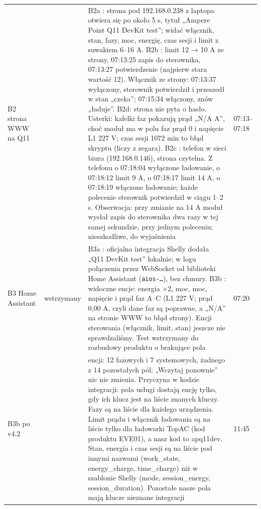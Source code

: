 \documentclass[11pt,a4paper]{article}
\begin{document}
\begin{longtable}{>{\raggedright\arraybackslash}p{3.00cm}>{\raggedright\arraybackslash}p{2.62cm}>{\raggedright\arraybackslash}p{7.10cm}>{\raggedright\arraybackslash}p{2.11cm}}
B2 strona WWW na Q11 & \leavevmode{\symbolfont\color{apgreen}\textbf{✔}} & B2a \leavevmode{\symbolfont\color{apgreen}\textbf{✔}}: strona pod 192.168.0.238 z laptopa otwiera się po około 5 s, tytuł „Ampere Point Q11 DevKit test”; widać włącznik, stan, fazy, moc, energię, czas sesji i limit z suwakiem 6–16 A. B2b \leavevmode{\symbolfont\color{apgreen}\textbf{✔}}: limit 12 {\symbolfont→} 10 A ze strony, 07:13:25 zapis do sterownika, 07:13:27 potwierdzenie (najpierw stara wartość 12). Włącznik ze strony: 07:13:37 wyłączony, sterownik potwierdził i przeszedł w stan „czeka”; 07:15:34 włączony, znów „ładuje”. B2d: strona nie pyta o hasło. Usterki: kafelki faz pokazują prąd „N/A A”, choć moduł ma w polu faz prąd 0 i napięcie L1 227 V; czas sesji 1072 min to błąd skryptu (liczy z zegara). B2c \leavevmode{\symbolfont\color{apgreen}\textbf{✔}}: telefon w sieci biura (192.168.0.146), strona czytelna. Z telefonu o 07:18:04 wyłączone ładowanie, o 07:18:12 limit 9 A, o 07:18:17 limit 14 A, o 07:18:19 włączone ładowanie; każde polecenie sterownik potwierdził w ciągu 1–2 s. Obserwacja: przy zmianie na 14 A moduł wysłał zapis do sterownika dwa razy w tej samej sekundzie, przy jednym poleceniu; nieszkodliwe, do wyjaśnienia & 29.09 07:13–07:18 \\
B3 Home Assistant & \leavevmode{\symbolfont\color{apamber}\textbf{◐}} wstrzymany & B3a \leavevmode{\symbolfont\color{apgreen}\textbf{✔}}: oficjalna integracja Shelly dodała „Q11 DevKit test” lokalnie; w logu połączenia przez WebSocket od biblioteki Home Assistant (\texttt{aios-…}), bez chmury. B3b \leavevmode{\symbolfont\color{apamber}\textbf{◐}}: widoczne encje: energia ×2, moc, moc, napięcie i prąd faz A–C (L1 227 V; prąd 0,00 A, czyli dane faz są poprawne, a „N/A” na stronie WWW to błąd strony). Encji sterowania (włącznik, limit, stan) jeszcze nie sprawdzaliśmy. Test wstrzymany do rozbudowy produktu o brakujące pola & 29.09 07:20 \\
B3b po v4.2 & \leavevmode{\symbolfont\color{apamber}\textbf{◐}} & 19 encji: 12 fazowych i 7 systemowych, żadnego z 14 pozostałych pól; „Wczytaj ponownie” nic nie zmienia. Przyczyna w kodzie integracji: pola usługi dostają encję tylko, gdy ich klucz jest na liście znanych kluczy. Fazy są na liście dla każdego urządzenia. Limit prądu i włącznik ładowania są na liście tylko dla ładowarki TopAC (kod produktu EVE01), a nasz kod to apq11dev. Stan, energia i czas sesji są na liście pod innymi nazwami (work\_state, energy\_charge, time\_charge) niż w szablonie Shelly (mode, session\_energy, session\_duration). Pozostałe nasze pola mają klucze nieznane integracji & 29.09 11:45 \\

\end{longtable}
\end{document}

